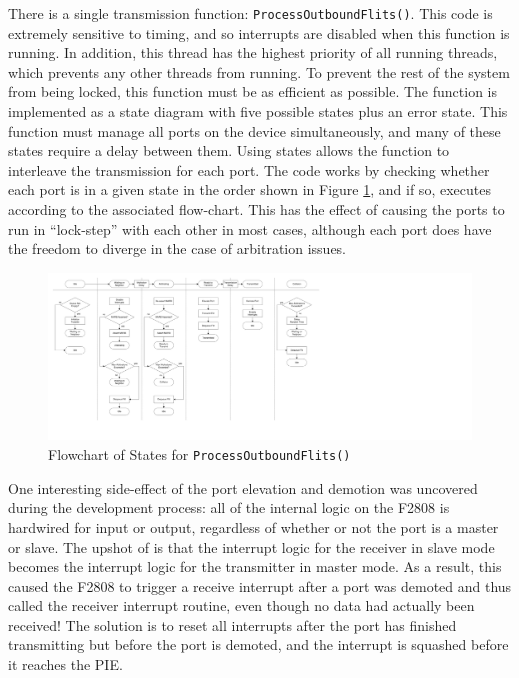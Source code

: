 There is a single transmission function: \lstinline$ProcessOutboundFlits()$. This code is extremely sensitive to timing, and so interrupts are disabled when this function is running. In addition, this thread has the highest priority of all running threads, which prevents any other threads from running. To prevent the rest of the system from being locked, this function must be as efficient as possible. The function is implemented as a state diagram with five possible states plus an error state. This function must manage all ports on the device simultaneously, and many of these states require a delay between them. Using states allows the function to interleave the transmission for each port. The code works by checking whether each port is in a given state in the order shown in Figure \ref{fig:spi:transmit_state_charts}, and if so, executes according to the associated flow-chart. This has the effect of causing the ports to run in ``lock-step'' with each other in most cases, although each port does have the freedom to diverge in the case of arbitration issues. 

\begin{landscape}
	\begin{figure}[p]
		\begin{centering}
			\includegraphics[width=8.5in]{SPI/Figures/spi-transmit_state_charts.pdf}
			\caption{Flowchart of States for \lstinline$ProcessOutboundFlits()$}
			\label{fig:spi:transmit_state_charts}
		\end{centering}
	\end{figure}
\end{landscape}

One interesting side-effect of the port elevation and demotion was uncovered during the development process: all of the internal logic on the F2808 is hardwired for input or output, regardless of whether or not the port is a master or slave. The upshot of is that the interrupt logic for the receiver in slave mode becomes the interrupt logic for the transmitter in master mode. As a result, this caused the F2808 to trigger a receive interrupt after a port was demoted and thus called the receiver interrupt routine, even though no data had actually been received! The solution is to reset all interrupts after the port has finished transmitting but before the port is demoted, and the interrupt is squashed before it reaches the PIE.


